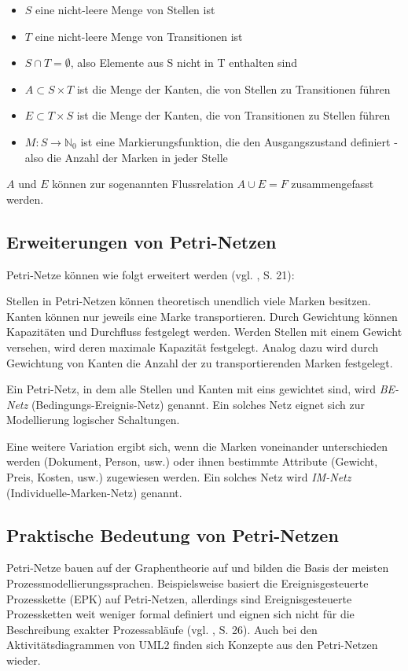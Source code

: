 \begin{itemize}
\item $S$ eine nicht-leere Menge von Stellen ist
\item $T$ eine nicht-leere Menge von Transitionen ist
\item $S \cap T = \emptyset$, also Elemente aus S nicht in T enthalten sind
\item $A \subset S \times T$ ist die Menge der Kanten, die von Stellen zu Transitionen führen
\item $E \subset T \times S$ ist die Menge der Kanten, die von Transitionen zu Stellen führen
\item $M : S \rightarrow \mathds{N}_0$ ist eine Markierungsfunktion, die den Ausgangszustand definiert - also die Anzahl der Marken in jeder Stelle
\end{itemize}

$A$ und $E$ können zur sogenannten Flussrelation $A \cup E = F$ zusammengefasst werden.


\subsection{Erweiterungen von Petri-Netzen}
Petri-Netze können wie folgt erweitert werden (vgl. \citep{BernroiderStix2006}, S. 21):

Stellen in Petri-Netzen können theoretisch unendlich viele Marken besitzen. Kanten können nur jeweils eine Marke transportieren. Durch Gewichtung können Kapazitäten und Durchfluss festgelegt werden. Werden Stellen mit einem Gewicht versehen, wird deren maximale Kapazität festgelegt. Analog dazu wird durch Gewichtung von Kanten die Anzahl der  zu transportierenden Marken festgelegt.


Ein Petri-Netz, in dem alle Stellen und Kanten mit eins gewichtet sind, wird \emph{BE-Netz} (Bedingungs-Ereignis-Netz) genannt. Ein solches Netz eignet sich zur Modellierung logischer Schaltungen.

Eine weitere Variation ergibt sich, wenn die Marken voneinander unterschieden werden (Dokument, Person, usw.) oder ihnen bestimmte Attribute (Gewicht, Preis, Kosten, usw.) zugewiesen werden. Ein solches Netz wird \emph{IM-Netz} (Individuelle-Marken-Netz) genannt.


\subsection{Praktische Bedeutung von Petri-Netzen}
Petri-Netze bauen auf der Graphentheorie auf und bilden die Basis der meisten Prozessmodellierungssprachen. Beispielsweise basiert die Ereignisgesteuerte Prozesskette (EPK) auf Petri-Netzen, allerdings sind Ereignisgesteuerte Prozessketten weit weniger formal definiert und eignen sich nicht für die Beschreibung exakter Prozessabläufe (vgl. \citep{BernroiderStix2006}, S. 26). Auch bei den Aktivitätsdiagrammen von UML2 finden sich Konzepte aus den Petri-Netzen wieder.

